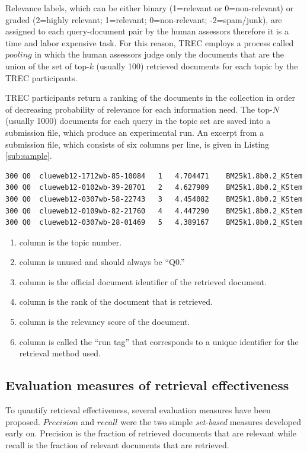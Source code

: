 Relevance labels, which can be either binary (1=relevant or 0=non-relevant) or graded (2=highly relevant; 1=relevant; 0=non-relevant; -2=spam/junk), are assigned to each query-document pair by the human assessors therefore it is a time and labor expensive task.
For this reason, TREC employs a process called $pooling$ in which the human assessors judge only the documents that are the union of the set of top-$k$ (usually 100) retrieved documents for each topic by the TREC participants.

TREC participants return a ranking of the documents in the collection in order of decreasing probability of relevance for each information need.
The top-$N$ (usually 1000) documents for each query in the topic set are saved into a submission file, which produce an experimental run.
An excerpt from a submission file, which consists of six columns per line, is given in Listing \ref{sub:sample}.

\begin{lstlisting}
300	Q0	clueweb12-1712wb-85-10084	1	4.704471	BM25k1.8b0.2_KStem
300	Q0	clueweb12-0102wb-39-28701	2	4.627909	BM25k1.8b0.2_KStem
300	Q0	clueweb12-0307wb-58-22743	3	4.454082	BM25k1.8b0.2_KStem
300	Q0	clueweb12-0109wb-82-21760	4	4.447290	BM25k1.8b0.2_KStem
300	Q0	clueweb12-0307wb-28-01469	5	4.389167	BM25k1.8b0.2_KStem
\end{lstlisting}

\begin{enumerate}
\item column is the topic number.
\item column is unused and should always be ``Q0.''
\item column is the official document identifier of the retrieved document.
\item column is the rank of the document that is retrieved.
\item column is the relevancy score of the document.
\item column is called the ``run tag'' that corresponds to a unique identifier for the retrieval method used.
\end{enumerate}

\subsection{Evaluation measures of retrieval effectiveness}
To quantify retrieval effectiveness, several evaluation measures have been proposed.
$Precision$ and $recall$ were the  two simple \emph{set-based} measures developed early on.
Precision is the fraction of retrieved documents that are relevant while recall is the fraction of relevant documents that are retrieved. 

